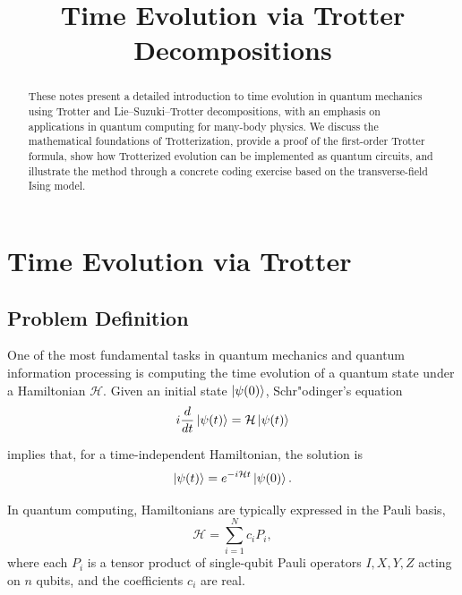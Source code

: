 \documentclass[11pt]{article}
\title{Time Evolution via Trotter Decompositions}
\begin{document}
\maketitle

\begin{abstract}

  These notes present a detailed introduction to time evolution in
  quantum mechanics using Trotter and Lie--Suzuki--Trotter
  decompositions, with an emphasis on applications in quantum
  computing for many-body physics. We discuss the
  mathematical foundations of Trotterization, provide a proof of the
  first-order Trotter formula, show how Trotterized evolution can be
  implemented as quantum circuits, and illustrate the method through a
  concrete coding exercise based on the transverse-field Ising model.

\end{abstract}

\tableofcontents

\section{Time Evolution via Trotter}

\subsection{Problem Definition}

One of the most fundamental tasks in quantum mechanics and quantum information processing is computing the time evolution of a quantum state under a Hamiltonian $\mathcal{H}$. Given an initial state $\ket{\psi(0)}$, Schr"odinger's equation
\begin{equation}
i\frac{d}{dt}\ket{\psi(t)} = \mathcal{H}\ket{\psi(t)}
\end{equation}

implies that, for a time-independent Hamiltonian, the solution is
\begin{equation}
\ket{\psi(t)} = e^{-i\mathcal{H}t}\ket{\psi(0)}.
\end{equation}

In quantum computing, Hamiltonians are typically expressed in the Pauli basis,
\begin{equation}
\mathcal{H} = \sum_{i=1}^N c_i P_i,
\end{equation}
where each $P_i$ is a tensor product of single-qubit Pauli operators ${I,X,Y,Z}$ acting on $n$ qubits, and the coefficients $c_i$ are real.
\end{document}
